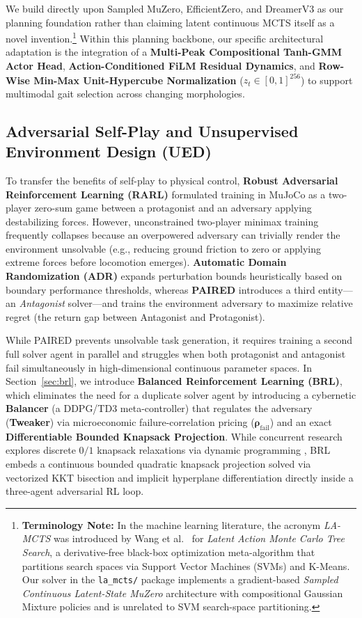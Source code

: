 \documentclass[11pt,a4paper]{article}
\begin{document}
We build directly upon Sampled MuZero, EfficientZero, and DreamerV3 as our planning foundation rather than claiming latent continuous MCTS itself as a novel invention.\footnote{\textbf{Terminology Note:} In the machine learning literature, the acronym \emph{LA-MCTS} was introduced by Wang et al.~\cite{wang2020learning} for \emph{Latent Action Monte Carlo Tree Search}, a derivative-free black-box optimization meta-algorithm that partitions search spaces via Support Vector Machines (SVMs) and K-Means. Our solver in the \texttt{la\_mcts/} package implements a gradient-based \emph{Sampled Continuous Latent-State MuZero} architecture with compositional Gaussian Mixture policies and is unrelated to SVM search-space partitioning.} Within this planning backbone, our specific architectural adaptation is the integration of a \textbf{Multi-Peak Compositional Tanh-GMM Actor Head}, \textbf{Action-Conditioned FiLM Residual Dynamics}, and \textbf{Row-Wise Min-Max Unit-Hypercube Normalization} ($z_t \in [0, 1]^{256}$) to support multimodal gait selection across changing morphologies.

\subsection{Adversarial Self-Play and Unsupervised Environment Design (UED)}
To transfer the benefits of self-play to physical control, \textbf{Robust Adversarial Reinforcement Learning (RARL)} \cite{pinto2017robust} formulated training in MuJoCo as a two-player zero-sum game between a protagonist and an adversary applying destabilizing forces. However, unconstrained two-player minimax training frequently collapses because an overpowered adversary can trivially render the environment unsolvable (e.g., reducing ground friction to zero or applying extreme forces before locomotion emerges). \textbf{Automatic Domain Randomization (ADR)} \cite{openai2019solving} expands perturbation bounds heuristically based on boundary performance thresholds, whereas \textbf{PAIRED} \cite{dennis2020emergent} introduces a third entity—an \emph{Antagonist} solver—and trains the environment adversary to maximize relative regret (the return gap between Antagonist and Protagonist).

While PAIRED prevents unsolvable task generation, it requires training a second full solver agent in parallel and struggles when both protagonist and antagonist fail simultaneously in high-dimensional continuous parameter spaces. In Section~\ref{sec:brl}, we introduce \textbf{Balanced Reinforcement Learning (BRL)}, which eliminates the need for a duplicate solver agent by introducing a cybernetic \textbf{Balancer} (a DDPG/TD3 meta-controller) that regulates the adversary (\textbf{Tweaker}) via microeconomic failure-correlation pricing ($\boldsymbol{\rho}_{\text{fail}}$) and an exact \textbf{Differentiable Bounded Knapsack Projection}. While concurrent research explores discrete $0/1$ knapsack relaxations via dynamic programming \cite{vivier2026differentiable}, BRL embeds a continuous bounded quadratic knapsack projection solved via vectorized KKT bisection and implicit hyperplane differentiation directly inside a three-agent adversarial RL loop.
\end{document}
